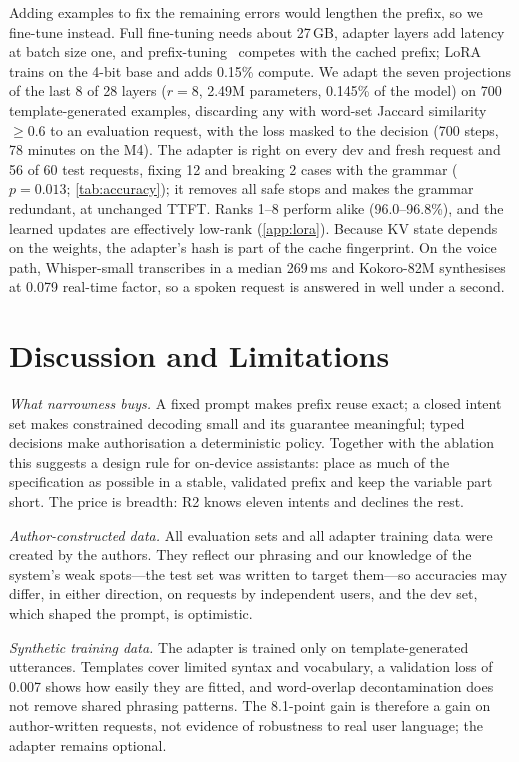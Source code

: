 \documentclass[journal]{IEEEtran}
\theoremstyle{definition}
\begin{document}
Adding examples to fix the remaining errors would lengthen the prefix, so we fine-tune instead.
Full fine-tuning needs about 27\,GB, adapter layers add latency at batch size one, and
prefix-tuning~\cite{li2021prefix} competes with the cached prefix; LoRA~\cite{hu2022lora} trains on
the 4-bit base and adds 0.15\% compute. We adapt the seven projections of the last 8 of 28 layers
($r=8$, 2.49M parameters, 0.145\% of the model) on 700 template-generated examples, discarding any
with word-set Jaccard similarity $\ge0.6$ to an evaluation request, with the loss masked to the
decision (700 steps, 78 minutes on the M4). The adapter is right on every dev and fresh request and
56 of 60 test requests, fixing 12 and breaking 2 cases with the grammar ($p=0.013$;
\cref{tab:accuracy}); it removes all safe stops and makes the grammar redundant, at unchanged TTFT.
Ranks 1--8 perform alike (96.0--96.8\%), and the learned updates are effectively low-rank
(\cref{app:lora}). Because KV state depends on the weights, the adapter's hash is part of the cache
fingerprint. On the voice path, Whisper-small transcribes in a median 269\,ms and Kokoro-82M
synthesises at 0.079 real-time factor, so a spoken request is answered in well under a second.

\section{Discussion and Limitations}\label{sec:limits}

\emph{What narrowness buys.} A fixed prompt makes prefix reuse exact; a closed intent set makes
constrained decoding small and its guarantee meaningful; typed decisions make authorisation a
deterministic policy. Together with the ablation this suggests a design rule for on-device
assistants: place as much of the specification as possible in a stable, validated prefix and keep
the variable part short. The price is breadth: R2 knows eleven intents and declines the rest.

\emph{Author-constructed data.} All evaluation sets and all adapter training data were created by
the authors. They reflect our phrasing and our knowledge of the system's weak spots---the test set
was written to target them---so accuracies may differ, in either direction, on requests by
independent users, and the dev set, which shaped the prompt, is optimistic.

\emph{Synthetic training data.} The adapter is trained only on template-generated utterances.
Templates cover limited syntax and vocabulary, a validation loss of 0.007 shows how easily they are
fitted, and word-overlap decontamination does not remove shared phrasing patterns. The 8.1-point gain
is therefore a gain on author-written requests, not evidence of robustness to real user language;
the adapter remains optional.
\end{document}

